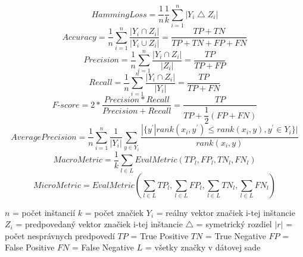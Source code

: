 \begin{equation}
	HammingLoss =  \dfrac{1}{n} \dfrac{1}{k} \sum_{i=1}^{n} | Y_{i} \bigtriangleup Z_{i} | \label{rovnica1}
\end{equation}
\begin{equation}
	Accuracy =  \dfrac{1}{n}  \sum_{i=1}^{n} \dfrac{| Y_{i} \cap Z_{i} |} {| Y_{i} \cup Z_{i} |} = \dfrac{TP + TN}{TP + TN + FP + FN} \label{rovnica2}
\end{equation}
\begin{equation}
	Precision =  \dfrac{1}{n}  \sum_{i=1}^{n} \dfrac{| Y_{i} \cap Z_{i} |} {| Z_{i} |} = \dfrac{TP}{TP + FP} \label{rovnica3}
\end{equation}
\begin{equation}
	Recall =  \dfrac{1}{n}  \sum_{i=1}^{n} \dfrac{| Y_{i} \cap Z_{i} |} {| Y_{i} |} = \dfrac{TP}{TP + FN} \label{rovnica4}
\end{equation}
\begin{equation}
	\textit{F-score} =  2* \dfrac{Precision*Recall}{Precision+Recall} =  \dfrac{TP}{TP + \dfrac{1}{2} (FP + FN)} \label{rovnica5}
\end{equation}
\begin{equation}
	AveragePrecision = \dfrac{1}{n}  \sum_{i=1}^{n} \dfrac{1}{| Y_{i} |} \sum_{y \in Y_{i}} 
	\dfrac{| \{ y^{'}|rank(x_{i},y^{'}) \leq rank(x_{i},y), y^{'} \in  Y_{i} \}|} {rank(x_{i},y)} \label{rovnica6}
\end{equation}
\begin{equation}
	MacroMetric =  \dfrac{1}{k} \sum_{l \in L} EvalMetric(TP_{l},FP_{l},TN_{l},FN_{l})  \label{rovnica7}
\end{equation}
\begin{equation}
	MicroMetric =  EvalMetric( \sum_{l \in L} TP_{l}, \sum_{l \in L} FP_{l}, \sum_{l \in L} TN_{l}, \sum_{l \in L} FN_{l} )  \label{rovnica8}
\end{equation}


\noindent\(n\) = počet inštancií \newline
\(k\) = počet značiek  \newline
\(Y_{i}\) = reálny vektor značiek i-tej inštancie  \newline
\(Z_{i}\) = predpovedaný vektor značiek i-tej inštancie \newline
\(\bigtriangleup\) = symetrický rozdiel  \newline
\(|r|\) = počet nesprávnych predpovedí \newline
\(TP\) = True Positive \newline
\(TN\) = True Negative \newline
\(FP\) = False Positive \newline
\(FN\) = False Negative \newline
\(L\) = všetky značky v dátovej sade  \newline


